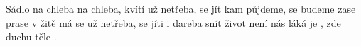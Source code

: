 \begin{TEXT}{Sádlo na chleba}
\SLOKA* {} na chleba, kvítí \NL
{} už netřeba,  se jít \NL
{}kam půjdeme,  se budeme \NL
{} zase   prase v žitě má se \NL
{} už netřeba,  se jíti \NL
{} i dareba  snít \NL
{} život není  \NL
{} nás láká  \NL
{} je ,  zde  \NL
{} duchu  těle . \NL
\end{TEXT}
